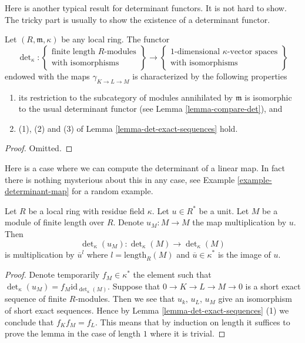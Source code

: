 \medskip\noindent
Here is another typical result for determinant functors.
It is not hard to show. The tricky part is usually to show the
existence of a determinant functor.

\begin{lemma}
\label{lemma-uniqueness-det}
Let $(R, \mathfrak m, \kappa)$ be any local ring.
The functor
$$
\det\nolimits_\kappa :
\left\{
\begin{matrix}
\text{finite length }R\text{-modules} \\
\text{with isomorphisms}
\end{matrix}
\right\}
\longrightarrow
\left\{
\begin{matrix}
1\text{-dimensional }\kappa\text{-vector spaces} \\
\text{with isomorphisms}
\end{matrix}
\right\}
$$
endowed with the maps $\gamma_{K \to L \to M}$ is characterized by
the following properties
\begin{enumerate}
\item its restriction to the subcategory of modules annihilated
by $\mathfrak m$ is isomorphic to the usual determinant functor
(see Lemma \ref{lemma-compare-det}), and
\item (1), (2) and (3) of Lemma \ref{lemma-det-exact-sequences}
hold.
\end{enumerate}
\end{lemma}

\begin{proof}
Omitted.
\end{proof}

\noindent
Here is a case where we can compute the determinant of a linear map.
In fact there is nothing mysterious about this in any case, see
Example \ref{example-determinant-map} for a random example.

\begin{lemma}
\label{lemma-times-u-determinant}
Let $R$ be a local ring with residue field $\kappa$.
Let $u \in R^*$ be a unit.
Let $M$ be a module of finite length over $R$.
Denote $u_M : M \to M$ the map multiplication by $u$.
Then
$$
\det\nolimits_\kappa(u_M) :
\det\nolimits_\kappa(M)
\longrightarrow
\det\nolimits_\kappa(M)
$$
is multiplication by $\overline{u}^l$ where $l = \text{length}_R(M)$
and $\overline{u} \in \kappa^*$ is the image of $u$.
\end{lemma}

\begin{proof}
Denote temporarily $f_M \in \kappa^*$ the element such that
$\det\nolimits_\kappa(u_M) = f_M \text{id}_{\det\nolimits_\kappa(M)}$.
Suppose that $0 \to K \to L \to M \to 0$ is a short
exact sequence of finite $R$-modules. Then we see that
$u_k$, $u_L$, $u_M$ give an isomorphism of short exact sequences.
Hence by Lemma \ref{lemma-det-exact-sequences} (1) we conclude that
$f_K f_M = f_L$.
This means that by induction on length it suffices to prove the
lemma in the case of length $1$ where it is trivial.
\end{proof}

